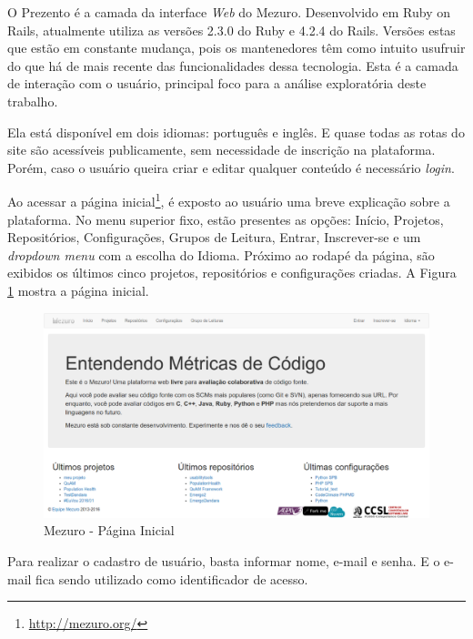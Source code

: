 O Prezento é a camada da interface \textit{Web} do
Mezuro. Desenvolvido em Ruby on Rails, atualmente utiliza as versões 2.3.0 do
Ruby e 4.2.4 do Rails. Versões estas que estão em constante mudança, pois os
mantenedores têm como intuito usufruir do que há de mais recente das funcionalidades
dessa tecnologia. Esta é a camada de interação com o usuário, principal foco
para a análise exploratória deste trabalho.

Ela está disponível em dois idiomas: português e inglês. E quase todas as rotas
do site são acessíveis publicamente, sem necessidade de inscrição na plataforma.
Porém, caso o usuário queira criar e editar qualquer conteúdo é necessário
\textit{login}.

Ao acessar a página inicial\footnote{\url{http://mezuro.org/}}, é exposto ao
usuário uma breve explicação sobre a plataforma. No menu superior fixo, estão
presentes as opções: Início, Projetos, Repositórios, Configurações, Grupos de
Leitura, Entrar, Inscrever-se e um \textit{dropdown menu} com a escolha do
Idioma. Próximo ao rodapé da página, são exibidos os últimos cinco projetos,
repositórios e configurações criadas. A Figura \ref{fig:mezuro-homepage}
mostra a página inicial.

\begin{figure}[!htb]
	\centering
    \includegraphics[keepaspectratio=true,scale=0.3]
    {figuras/mezuro-homepage.eps}
  \caption{Mezuro - Página Inicial}
	\label{fig:mezuro-homepage}
\end{figure}

\newpage

Para realizar o cadastro de usuário, basta informar nome, e-mail e senha. E o
e-mail fica sendo utilizado como identificador de acesso.

